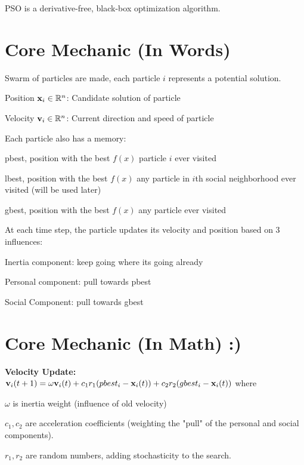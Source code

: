 PSO is a derivative-free, black-box optimization algorithm.

\section*{Core Mechanic (In Words)}

Swarm of particles are made, each particle $i$ represents a potential solution. 

\begin{tightitemize}
    \item Position $\mathbf{x}_i \in \mathbb{R}^n$: Candidate solution of particle
    \item Velocity $\mathbf{v}_i \in \mathbb{R}^n$: Current direction and speed of particle 
\end{tightitemize}

Each particle also has a memory:
\begin{tightitemize}
    \item pbest, position with the best $f(x)$ particle $i$ ever visited
    \item lbest, position with the best $f(x)$ any particle in $i$th social 
    neighborhood ever visited (will be used later)
    \item gbest, position with the best $f(x)$ any particle ever visited
\end{tightitemize}

At each time step, the particle updates its velocity and position based on 
3 influences:
\begin{tightitemize}
    \item Inertia component: keep going where its going already
    \item Personal component: pull towards pbest 
    \item Social Component: pull towards gbest 
\end{tightitemize}

\section*{Core Mechanic (In Math) :)}
\textbf{Velocity Update:} 
$
\mathbf{v}_i(t+1) = \omega \mathbf{v}_i(t) + c_1 r_1 (pbest_i - \mathbf{x}_i(t)) + c_2 r_2 (gbest_i - \mathbf{x}_i(t))
$
where 
\begin{tightitemize}
    \item $\omega$ is inertia weight (influence of old velocity)
    \item $c_1,c_2$ are acceleration coefficients (weighting the "pull" of the personal and social components).
    \item $r_1,r_2$ are random numbers, adding stochasticity to the search.
\end{tightitemize}

